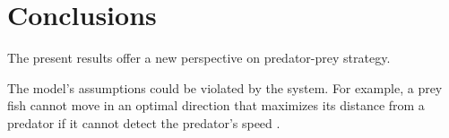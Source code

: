 \documentclass[12pt]{article}
\begin{document}
\section{Conclusions}

The present results offer a new perspective on predator-prey strategy. 


The model's assumptions could be violated by the system. For example, a prey
fish cannot move in an optimal direction that maximizes its distance from a
predator if it cannot detect the predator's speed \citep{Weihs:1984tb}.

\pagebreak



\end{document}
